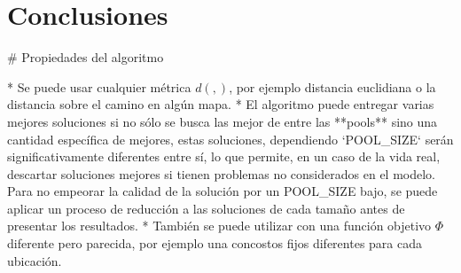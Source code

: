 \section{Conclusiones}

# Propiedades del algoritmo

* Se puede usar cualquier métrica $d(,)$, por ejemplo distancia euclidiana o la distancia sobre el camino en algún mapa.
* El algoritmo puede entregar varias mejores soluciones si no sólo se busca las mejor de entre las **pools** sino una cantidad específica de mejores, estas soluciones, dependiendo `POOL_SIZE` serán significativamente diferentes entre sí, lo que permite, en un caso de la vida real, descartar soluciones mejores si tienen problemas no considerados en el modelo. Para no empeorar la calidad de la solución por un POOL_SIZE bajo, se puede aplicar un proceso de reducción a las soluciones de cada tamaño antes de presentar los resultados.
* También se puede utilizar con una función objetivo $\Phi$ diferente pero parecida, por ejemplo una concostos fijos diferentes para cada ubicación.



